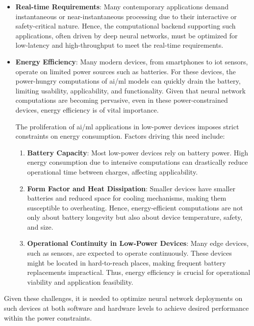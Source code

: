 \begin{itemize}
	\item \textbf{Real-time Requirements}:
	Many contemporary applications demand instantaneous or near-instantaneous processing due to their interactive or safety-critical nature. Hence, the computational backend supporting such applications, often driven by deep neural networks, must be optimized for low-latency and high-throughput to meet the real-time requirements.
	
	\item \textbf{Energy Efficiency}: Many modern devices, from smartphones to \gls{iot} sensors, operate on limited power sources such as batteries. For these devices, the power-hungry computations of \gls{ai}/\gls{ml} models can quickly drain the battery, limiting usability, applicability, and functionality. Given that neural network computations are becoming pervasive, even in these power-constrained devices, energy efficiency is of vital importance.
	
	The proliferation of \gls{ai}/\gls{ml} applications in low-power devices imposes strict constraints on energy consumption. Factors driving this need include:
	
	\begin{enumerate}
		\item \textbf{Battery Capacity}: Most low-power devices rely on battery power. High energy consumption due to intensive computations can drastically reduce operational time between charges, affecting applicability.
		
		\item \textbf{Form Factor and Heat Dissipation}: Smaller devices have smaller batteries and reduced space for cooling mechanisms, making them susceptible to overheating. Hence, energy-efficient computations are not only about battery longevity but also about device temperature, safety, and size.
		
		\item \textbf{Operational Continuity in Low-Power Devices}: Many edge devices, such as sensors, are expected to operate continuously. These devices might be located in hard-to-reach places, making frequent battery replacements impractical. Thus, energy efficiency is crucial for operational viability and application feasibility.
	\end{enumerate}
	
\end{itemize}

Given these challenges, it is needed to optimize neural network deployments on such devices at both software and hardware levels to achieve desired performance within the power constraints.

